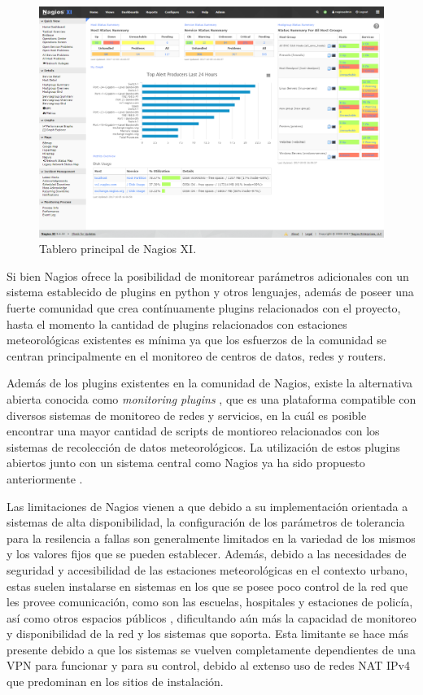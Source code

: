 \begin{figure}[!ht]
	\centering
	\includegraphics[width=.80\linewidth]{images/Nagios_home_dashboard.png}
	\caption{Tablero principal de Nagios XI.}
	\label{fig:nagios_dashboard}
\end{figure}

Si bien Nagios ofrece la posibilidad de monitorear parámetros adicionales con un sistema establecido de plugins en python y otros lenguajes, además de poseer una fuerte comunidad que crea contínuamente plugins relacionados con el proyecto, hasta el momento la cantidad de plugins relacionados con estaciones meteorológicas existentes es mínima ya que los esfuerzos de la comunidad se centran principalmente en el monitoreo de centros de datos, redes y routers.

Además de los plugins existentes en la comunidad de Nagios, existe la alternativa abierta conocida como \textit{monitoring plugins} \cite{monitoring_plugins}, que es una plataforma compatible con diversos sistemas de monitoreo de redes y servicios, en la cuál es posible encontrar una mayor cantidad de scripts de montioreo relacionados con los sistemas de recolección de datos meteorológicos. La utilización de estos plugins abiertos junto con un sistema central como Nagios ya ha sido propuesto anteriormente \cite{monitoreo_raspberry_nagios}.

Las limitaciones de Nagios vienen a que debido a su implementación orientada a sistemas de alta disponibilidad, la configuración de los parámetros de tolerancia para la resilencia a fallas son generalmente limitados en la variedad de los mismos y los valores fijos que se pueden establecer. Además, debido a las necesidades de seguridad y accesibilidad de las estaciones meteorológicas en el contexto urbano, estas suelen instalarse en sistemas en los que se posee poco control de la red que les provee comunicación, como son las escuelas, hospitales y estaciones de policía, así como otros espacios públicos \cite{muller_sensors_and_the_city}, dificultando aún más la capacidad de monitoreo y disponibilidad de la red y los sistemas que soporta. Esta limitante se hace más presente debido a que los sistemas se vuelven completamente dependientes de una VPN para funcionar y para su control, debido al extenso uso de redes NAT IPv4 que predominan en los sitios de instalación.

